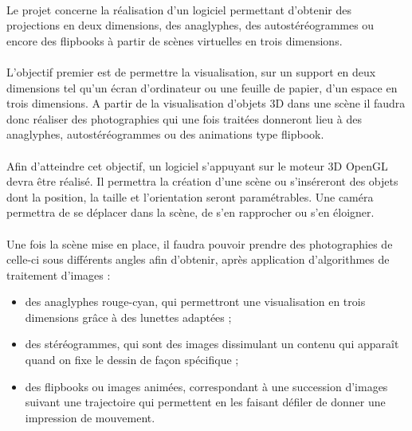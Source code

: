 \paragraph{}
	Le projet concerne la réalisation d’un logiciel permettant d’obtenir des projections en deux dimensions, des anaglyphes, des autostéréogrammes ou encore des flipbooks à partir de scènes virtuelles en trois dimensions. 

\paragraph{}
	L’objectif premier est de permettre la visualisation, sur un support en deux dimensions tel qu’un écran d’ordinateur ou une feuille de papier, d’un espace en trois dimensions. A partir de la visualisation d’objets 3D dans une scène il faudra donc réaliser des photographies qui une fois traitées donneront lieu à des anaglyphes, autostéréogrammes ou des animations type flipbook.
	
\paragraph{}
	Afin d’atteindre cet objectif, un logiciel s’appuyant sur le moteur 3D OpenGL devra être réalisé. Il permettra la création d’une scène ou s’inséreront des objets dont la position, la taille et l’orientation seront paramétrables. Une caméra permettra de se déplacer dans la scène, de s’en rapprocher ou s’en éloigner.

\paragraph{}
	Une fois la scène mise en place, il faudra pouvoir prendre des photographies de celle-ci sous différents angles afin d’obtenir, après application d’algorithmes de traitement d’images :

\begin{itemize}
	\item
		des anaglyphes rouge-cyan, qui permettront une visualisation en trois dimensions grâce à des lunettes adaptées ;
	\item
		des stéréogrammes, qui sont des images dissimulant un contenu qui apparaît quand on fixe le dessin de façon spécifique ;
	\item
		des flipbooks ou images animées, correspondant à une succession d’images suivant une trajectoire qui permettent en les faisant défiler de donner une impression de mouvement.
\end{itemize}